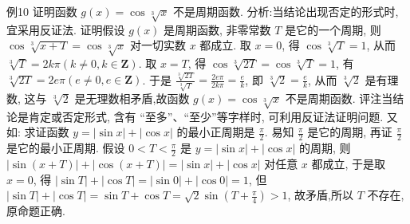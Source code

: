 例10 证明函数 $g(x)=\cos \sqrt[3]{x}$ 不是周期函数.
分析:当结论出现否定的形式时,宜采用反证法.
证明假设 $g(x)$ 是周期函数, 非零常数 $T$ 是它的一个周期, 则 $\cos \sqrt[3]{x+T}=\cos \sqrt[3]{x}$ 对一切实数 $x$ 都成立.
取 $x=0$, 得 $\cos \sqrt[3]{T}=1$, 从而 $\sqrt[3]{T}=2 k \pi(k \neq 0, k \in \mathbf{Z})$.
取 $x=T$, 得 $\cos \sqrt[3]{2 T}=\cos \sqrt[3]{T}=1$, 有 $\sqrt[3]{2 T}=2 e \pi(e \neq 0, e \in \mathbf{Z})$. 于是 $\frac{\sqrt[3]{2 T}}{\sqrt[3]{T}}=\frac{2 e \pi}{2 k \pi}=\frac{e}{k}$, 即 $\sqrt[3]{2}=\frac{e}{k}$, 从而 $\sqrt[3]{2}$ 是有理数, 这与 $\sqrt[3]{2}$ 是无理数相矛盾,故函数 $g(x)=\cos \sqrt[3]{x}$ 不是周期函数.
评注当结论是肯定或否定形式, 含有 “至多”、“至少”等字样时, 可利用反证法证明问题.
又如: 求证函数 $y=|\sin x|+|\cos x|$ 的最小正周期是 $\frac{\pi}{2}$.
易知 $\frac{\pi}{2}$ 是它的周期, 再证 $\frac{\pi}{2}$ 是它的最小正周期.
假设 $0<T<\frac{\pi}{2}$ 是 $y=|\sin x|+|\cos x|$ 的周期, 则 $|\sin (x+T)|+|\cos (x+T)|=|\sin x|+ |\cos x|$ 对任意 $x$ 都成立, 于是取 $x=0$, 得 $|\sin T|+|\cos T|=|\sin 0|+ |\cos 0|=1$, 但 $|\sin T|+|\cos T|=\sin T+\cos T=\sqrt{2} \sin \left(T+\frac{\pi}{4}\right)>1$, 故矛盾,所以 $T$ 不存在,原命题正确.



